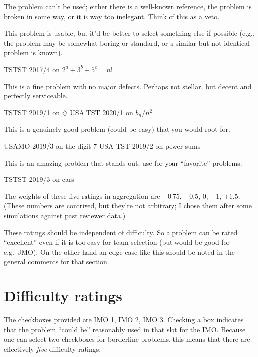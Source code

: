 \begin{description}
	\ii[Unsuitable] The problem can't be used;
	either there is a well-known reference,
	the problem is broken in some way,
	or it is way too inelegant.
	Think of this as a veto.

	\ii[Mediocre] This problem is usable,
	but it'd be better to select something else if possible
	(e.g., the problem may be somewhat boring or standard,
	or a similar but not identical problem is known).
	\begin{itemize}
		\ii TSTST 2017/4 on $2^a + 3^b + 5^c = n!$
	\end{itemize}

	\ii[Acceptable] This is a fine problem with no major defects.
	Perhaps not stellar, but decent and perfectly serviceable.
	\begin{itemize}
		\ii TSTST 2019/1 on $\diamondsuit$
		\ii USA TST 2020/1 on $b_n/n^2$
	\end{itemize}

	\ii[Nice] This is a genuinely good problem (could be easy)
	that you would root for.
	\begin{itemize}
		\ii USAMO 2019/3 on the digit $7$
		\ii USA TST 2019/2 on power sums
	\end{itemize}

	\ii[Excellent] This is an amazing problem that stands out;
	use for your ``favorite'' problems.
	\begin{itemize}
		\ii TSTST 2019/3 on cars
	\end{itemize}
\end{description}
The weights of these five ratings in aggregation
are $-0.75$, $-0.5$, $0$, $+1$, $+1.5$.
(These numbers are contrived, but they're not arbitrary;
I chose them after some simulations against past reviewer data.)

These ratings should be independent of difficulty.
So a problem can be rated ``excellent''
even if it is too easy for team selection
(but would be good for e.g.\ JMO).
On the other hand an edge case like this
should be noted in the general comments for that section.

\section{Difficulty ratings}
The checkboxes provided are IMO 1, IMO 2, IMO 3.
Checking a box indicates that the problem ``could be''
reasonably used in that slot for the IMO.
Because one can select two checkboxes for borderline problems,
this means that there are effectively \emph{five} difficulty ratings.

